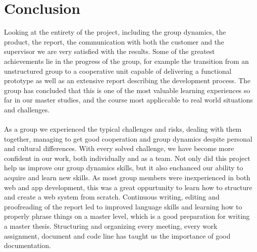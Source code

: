 \newpage
\section{Conclusion} 
Looking at the entirety of the project, including the group dynamics, the product, the report, the communication with both the customer and the supervisor we are very satisfied with the results. Some of the greatest achievements lie in the progress of the group, for example the transition from an unstructured group to a cooperative unit capable of delivering a functional prototype as well as an extensive report describing the development process. The group has concluded that this is one of the most valuable learning experiences so far in our master studies, and the course most appliccable to real world situations and challenges.

\paragraph{} As a group we experienced the typical challenges and risks, dealing with them together, managing to get good cooperation and group dynamics despite personal and cultural differences. With every solved challenge, we have become more confident in our work, both individually and as a team. Not only did this project help us improve our group dynamics skills, but it also enchanced our ability to acquire and learn new skills. As most group members were inexperienced in both web and app development, this was a great oppurtunity to learn how to structure and create a web system from scratch. Continuous writing, editing and proofreading of the report led to improved language skills and learning how to properly phrase things on a master level, which is a good preparation for writing a master thesis. Structuring and organizing every meeting, every work assignment, document and code line has taught us the importance of good documentation. 
